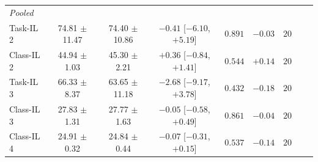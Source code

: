 \begin{table}[ht]
\begin{tabular}{lcccccccc}
\midrule
\multicolumn{7}{l}{\textit{Pooled}} \\
Task-IL 2 & 74.81 $\pm$ 11.47 & 74.40 $\pm$ 10.86 & $-0.41$ [$-6.10$, $+5.19$] & $0.891$ & $-0.03$ & $20$ \\
Class-IL 2 & 44.94 $\pm$ 1.03 & 45.30 $\pm$ 2.21 & $+0.36$ [$-0.84$, $+1.41$] & $0.544$ & $+0.14$ & $20$ \\
Task-IL 3 & 66.33 $\pm$ 8.37 & 63.65 $\pm$ 11.18 & $-2.68$ [$-9.17$, $+3.78$] & $0.432$ & $-0.18$ & $20$ \\
Class-IL 3 & 27.83 $\pm$ 1.31 & 27.77 $\pm$ 1.63 & $-0.05$ [$-0.58$, $+0.49$] & $0.861$ & $-0.04$ & $20$ \\
Class-IL 4 & 24.91 $\pm$ 0.32 & 24.84 $\pm$ 0.44 & $-0.07$ [$-0.31$, $+0.15$] & $0.537$ & $-0.14$ & $20$ \\
\bottomrule
\end{tabular}
\end{table}
